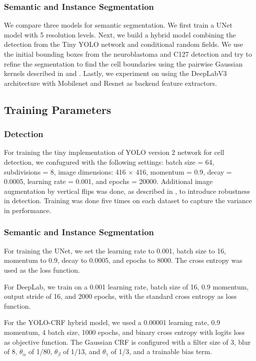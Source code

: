 \documentclass[10pt, journal, compsoc]{IEEEtran}
\begin{document}
\subsubsection{Semantic and Instance Segmentation}
We compare three models for semantic segmentation. We first train a UNet model with 5 resolution levels. Next, we build a hybrid model combining the detection from the Tiny YOLO network and conditional random fields. We use the initial bounding boxes from the neuroblastoma and C127 detection and try to refine the segmentation to find the cell boundaries using the pairwise Gaussian kernels described in \cite{NIPS2011_4296} and \cite{Teichmann2018ConvolutionalCF}. Lastly, we experiment on using the DeepLabV3 architecture with Mobilenet and Resnet as backend feature extractors.
\subsection{Training Parameters}
\subsubsection{Detection}
For training the tiny implementation of YOLO version 2 network for cell detection, we confugured with the following settings: batch size = 64, subdivisions = 8, image dimensions: 416 $\times$ 416, momentum = 0.9, decay = 0.0005, learning rate =  0.001, and epochs = 20000. Additional image augmentation by vertical flips was done, as described in \cite{Waithe544833}, to introduce robustness in detection. Training was done five times on each dataset to capture the variance in performance.
\subsubsection{Semantic and Instance Segmentation}
For training the UNet, we set the learning rate to 0.001, batch size to 16, momentum to 0.9, decay to 0.0005, and epochs to 8000. The cross entropy was used as the loss function. 

For DeepLab, we train on a 0.001 learning rate, batch size of 16, 0.9 momentum, output stride of 16, and 2000 epochs, with the standard cross entropy as loss function.

For the YOLO-CRF hybrid model, we used a 0.00001 learning rate, 0.9 momentum, 4 batch size, 1000 epochs, and binary cross entropy with logits loss as objective function. The Gaussian CRF is configured with a filter size of 3, blur of 8, $\theta_\alpha$ of 1/80, $\theta_\beta$ of 1/13, and $\theta_\gamma$ of 1/3, and a trainable bias term.
\end{document}
